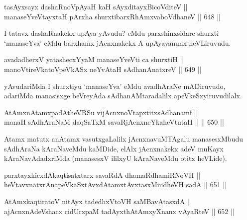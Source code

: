 
\begin{shl}
tasAyxsayx dashaRnoVpAyaH kaH sAyxditayxBicoVditeV || \\
manaseYveVtayxtaH pArxha shurxtibarxRhAmxvaboVdhaneV \hfill || 648 ||  
\end{shl}

\begin{artha}
I tatavx dashaRnakekx upAya yAvudu? eMdu parxshinxsidare shurxti `manaseYva' eMdu barxhamx jAcnxnakekx A upAyavanunx
heVLiruvudu.
\end{artha}

\begin{shl}
avadadherxV yatashecxYyaM manaseYveVti ca shurxtiH || \\
manoVtireVkatoV\s peVkASx neYvAtaH sAdhanAnatxreV \hfill || 649 ||  
\end{shl}

\begin{artha}
yAvudariMda I shurxtiyu `manaseYva' eMdu avadhAraNe mADiruvudo,
adariMda manasisxge beVreyAda sAdhanAMtaradalilx apeVkeSxyiruvudilalx.
\end{artha}

\begin{shl}
AtAmxnAtamxpadAtheVRSu vijAcnxnoVtapxtitxsAdhanamf || \\
manaH sAdhAraNaM daqSaTxM savaRjAcnxneYkaheVtutaH ||  \hfill || 650 ||  
\end{shl}

\begin{artha}
Atamx matutx anAtamx vasutxgaLalilx jAcnxnavuMTAgalu manasesxMbudu
sAdhAraNa kAraNaveMdu kaMDide, elAlx jAcnxnakekx adeV muKayx
kAraNavAdadxriMda (manasesxV ililxyU kAraNaveMdu otitx heVLide).
\end{artha}


\begin{shl}
parxtayxkicxdAkaqtisatxtarx savaRdA dhamaRdhamiRNoVH || \\
heVtavxnatxrAnapeVkaSxtAvxdAtamxtAvxtasxMnidheVH sadA \hfill || 651 ||  
\end{shl}

\begin{shl}
AtAmxkaqtiratoV nitAyx tadedhxVtoVH saMBavAtasxdA || \\
ajAcnxnAdeVshacx cidUrxpaM tadAyxthAtAmxyXnanx vAyaRteV \hfill || 652 ||  
\end{shl}

